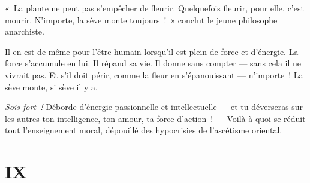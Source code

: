 \documentclass[french,twoside]{book} %
\begin{document}
« La plante ne peut pas s’empêcher de fleurir. Quelquefois fleurir, pour elle, c’est mourir. N’importe, la sève monte toujours ! » conclut le jeune philosophe anarchiste.\par
 Il en est de même pour l’être humain lorsqu’il est plein de force et d’énergie. La force s’accumule en lui. Il répand sa vie. Il donne sans compter — sans cela il ne vivrait pas. Et s’il doit périr, comme la fleur en s’épanouissant — n’importe ! La sève monte, si sève il y a.\par
\emph{Sois fort !} Déborde d’énergie passionnelle et intellectuelle — et tu déverseras sur les autres ton intelligence, ton amour, ta force d’action ! — Voilà à quoi se réduit tout l’enseignement moral, dépouillé des hypocrisies de l’ascétisme oriental.
\section[{IX}]{IX}
\label{p09}\renewcommand{\leftmark}{IX}
\end{document}
